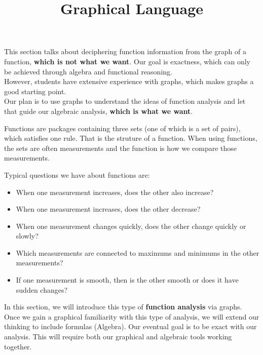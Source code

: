 \documentclass{ximera}
\title{Graphical Language}
\begin{document}
\begin{abstract}
\end{abstract}
\maketitle



\begin{warning}


This section talks about deciphering function information from the graph of a function, \textbf{\textcolor{red!80!black}{which is not what we want}}.  Our goal is exactness, which can only be achieved through algebra and functional reasoning.\\

However, students have extensive experience with graphs, which makes graphs a good starting point. \\

Our plan is to use graphs to understand the ideas of function analysis and let that guide our algebraic analysis, \textbf{\textcolor{red!80!black}{which is what we want}}.

\end{warning}




Functions are packages containing three sets (one of which is a set of pairs), which satisfies one rule.  That is the struture of a function.  When using functions, the sets are often measurements and the function is how we compare those measurements.

Typical questions we have about functions are:

\begin{itemize}
\item When one measurement increases, does the other also increase?
\item When one measurement increases, does the other decrease?
\item When one measurement changes quickly, does the other change quickly or slowly?
\item Which measurements are connected to maximums and minimums in the other measurements?
\item If one measurement is smooth, then is the other smooth or does it have sudden changes?
\end{itemize}


In this section, we will introduce this type of \textbf{function analysis} via graphs. Once we gain a graphical familiarity with this type of analysis, we will extend our thinking to include formulas (Algebra).  Our eventual goal is to be exact with our analysis.  This will require both our graphical and algebraic tools working together.
\end{document}
